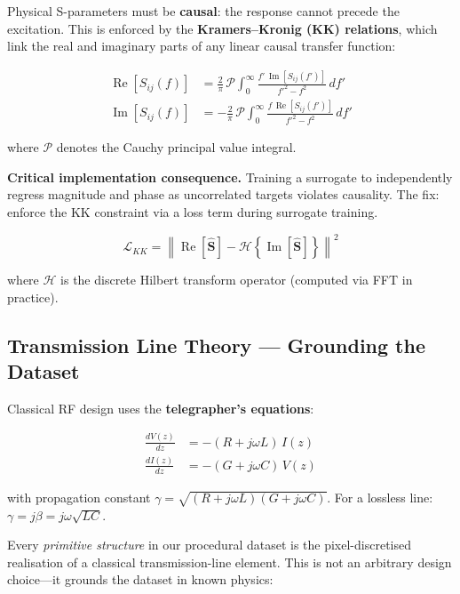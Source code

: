 \documentclass[12pt,a4paper]{article}
\newcommand{\Smat}{\mathbf{S}}
\newcommand{\Real}{\operatorname{Re}}
\newcommand{\Imag}{\operatorname{Im}}
\newcommand{\Hilbert}{\mathcal{H}}
\theoremstyle{definition}
\theoremstyle{plain}
\theoremstyle{remark}
\begin{document}
Physical S-parameters must be \textbf{causal}: the response cannot precede the
excitation.
This is enforced by the \textbf{Kramers--Kronig (KK) relations}, which link the real
and imaginary parts of any linear causal transfer function:

\begin{align}
  \Real[S_{ij}(f)] &=
    \frac{2}{\pi}\,\mathcal{P}\!\int_0^\infty
      \frac{f'\,\Imag[S_{ij}(f')]}{f'^2 - f^2}\,df'
  \label{eq:kk_real}\\[4pt]
  \Imag[S_{ij}(f)] &=
    -\frac{2}{\pi}\,\mathcal{P}\!\int_0^\infty
      \frac{f\,\Real[S_{ij}(f')]}{f'^2 - f^2}\,df'
  \label{eq:kk_imag}
\end{align}

where $\mathcal{P}$ denotes the Cauchy principal value integral.

\textbf{Critical implementation consequence.}
Training a surrogate to independently regress magnitude and phase as uncorrelated targets
violates causality.
The fix: enforce the KK constraint via a loss term during surrogate training.

\begin{equation}
  \mathcal{L}_{KK} =
    \left\|\Real[\hat{\Smat}] - \Hilbert\!\left\{\Imag[\hat{\Smat}]\right\}\right\|^2
  \label{eq:lkk}
\end{equation}

where $\Hilbert$ is the discrete Hilbert transform operator (computed via FFT in practice).

\subsection{Transmission Line Theory — Grounding the Dataset}
\label{sec:tl}

Classical RF design uses the \textbf{telegrapher's equations}:

\begin{align}
  \frac{dV(z)}{dz} &= -(R + j\omega L)\,I(z) \\
  \frac{dI(z)}{dz} &= -(G + j\omega C)\,V(z)
\end{align}

with propagation constant
$\gamma = \sqrt{(R+j\omega L)(G+j\omega C)}$.
For a lossless line: $\gamma = j\beta = j\omega\sqrt{LC}$.

Every \emph{primitive structure} in our procedural dataset is the pixel-discretised
realisation of a classical transmission-line element.
This is not an arbitrary design choice—it grounds the dataset in known physics:
\end{document}

